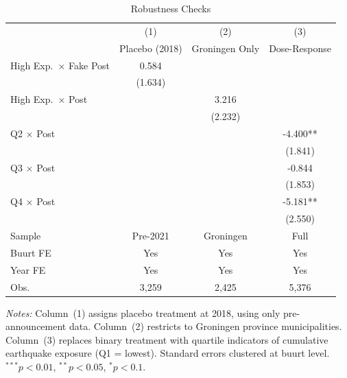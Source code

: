 \begin{table}[htbp]
\centering
\caption{Robustness Checks}
\label{tab:robustness}
\begin{tabular}{lccc}
\hline\hline
 & (1) & (2) & (3) \\
 & Placebo (2018) & Groningen Only & Dose-Response \\
\hline
High Exp.\ $\times$ Fake Post & 0.584 & & \\
 & (1.634) & & \\[6pt]
High Exp.\ $\times$ Post & & 3.216 & \\
 & & (2.232) & \\[6pt]
Q2 $\times$ Post & & & -4.400** \\
 & & & (1.841) \\[3pt]
Q3 $\times$ Post & & & -0.844 \\
 & & & (1.853) \\[3pt]
Q4 $\times$ Post & & & -5.181** \\
 & & & (2.550) \\[6pt]
\hline
Sample & Pre-2021 & Groningen & Full \\
Buurt FE & Yes & Yes & Yes \\
Year FE & Yes & Yes & Yes \\
Obs. & 3,259 & 2,425 & 5,376 \\
\hline\hline
\end{tabular}
\begin{tablenotes}[flushleft]
\small
\item \textit{Notes:} Column~(1) assigns placebo treatment at 2018, using only pre-announcement data. Column~(2) restricts to Groningen province municipalities. Column~(3) replaces binary treatment with quartile indicators of cumulative earthquake exposure (Q1 = lowest). Standard errors clustered at buurt level. $^{***}p<0.01$, $^{**}p<0.05$, $^{*}p<0.1$.
\end{tablenotes}
\end{table}
